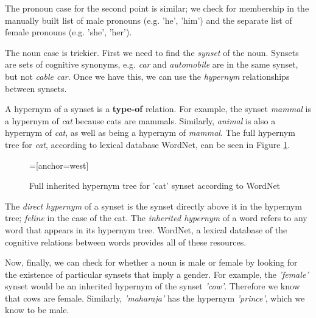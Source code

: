 The pronoun case for the second point is similar; we check for membership in the manually built list of male pronouns (e.g. 'he', 'him') and the separate list of female pronouns (e.g. 'she', 'her'). 

The noun case is trickier. First we need to find the \textit{synset} of the noun. Synsets are sets of cognitive synonyms, e.g. \textit{car} and \textit{automobile} are in the same synset, but not \textit{cable car}. Once we have this, we can use the \textit{hypernym} relationships between synsets.

A hypernym of a synset is a \textbf{type-of} relation. For example, the synset \textit{mammal} is a hypernym of \textit{cat} because cats are mammals. Similarly, \textit{animal} is also a hypernym of \textit{cat}, as well as being a hypernym of \textit{mammal}. The full hypernym tree for \textit{cat}, according to lexical database WordNet, can be seen in Figure \ref{fig:hypernym-tree-cat}. 


\begin{figure}[h!]
\centering
{}=[anchor=west]
\caption{Full inherited hypernym tree for 'cat' synset according to WordNet}
\label{fig:hypernym-tree-cat}
\end{figure}

The \textit{direct hypernym} of a synset is the synset directly above it in the hypernym tree; \textit{feline} in the case of the cat. The \textit{inherited hypernym} of a word refers to any word that appears in its hypernym tree. WordNet\cite{miller1995wordnet}, a lexical database of the cognitive relations between words provides all of these resources.

Now, finally, we can check for whether a noun is male or female by looking for the existence of particular synsets that imply a gender. For example, the \textit{'female'} synset would be an inherited hypernym of the synset \textit{'cow'}. Therefore we know that cows are female. Similarly, \textit{'maharaja'} has the hypernym \textit{'prince'}, which we know to be male.

